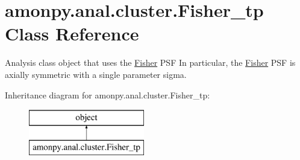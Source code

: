 \hypertarget{classamonpy_1_1anal_1_1cluster_1_1_fisher__tp}{\section{amonpy.\-anal.\-cluster.\-Fisher\-\_\-tp Class Reference}
\label{classamonpy_1_1anal_1_1cluster_1_1_fisher__tp}
}


Analysis class object that uses the \hyperlink{classamonpy_1_1anal_1_1cluster_1_1_fisher}{Fisher} P\-S\-F In particular, the \hyperlink{classamonpy_1_1anal_1_1cluster_1_1_fisher}{Fisher} P\-S\-F is axially symmetric with a single parameter sigma.  


Inheritance diagram for amonpy.\-anal.\-cluster.\-Fisher\-\_\-tp\-:\begin{figure}[H]
\begin{center}
\leavevmode
\includegraphics[height=2.000000cm]{d4/ddb/classamonpy_1_1anal_1_1cluster_1_1_fisher__tp}
\end{center}
\end{figure}
